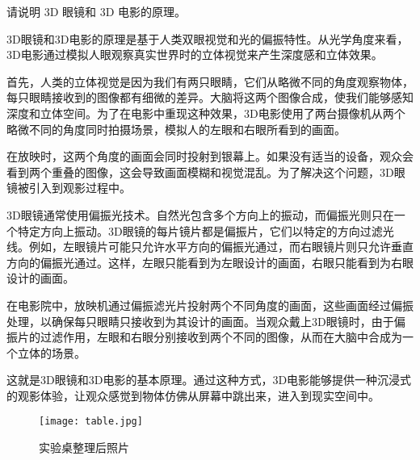 \documentclass[dvipsnames, svgnames,a4paper,11pt]{article}
\begin{document}
\begin{question}
	请说明 3D 眼镜和 3D 电影的原理。
\end{question}


3D眼镜和3D电影的原理是基于人类双眼视觉和光的偏振特性。从光学角度来看，3D电影通过模拟人眼观察真实世界时的立体视觉来产生深度感和立体效果。

首先，人类的立体视觉是因为我们有两只眼睛，它们从略微不同的角度观察物体，每只眼睛接收到的图像都有细微的差异。大脑将这两个图像合成，使我们能够感知深度和立体空间。为了在电影中重现这种效果，3D电影使用了两台摄像机从两个略微不同的角度同时拍摄场景，模拟人的左眼和右眼所看到的画面。

在放映时，这两个角度的画面会同时投射到银幕上。如果没有适当的设备，观众会看到两个重叠的图像，这会导致画面模糊和视觉混乱。为了解决这个问题，3D眼镜被引入到观影过程中。

3D眼镜通常使用偏振光技术。自然光包含多个方向上的振动，而偏振光则只在一个特定方向上振动。3D眼镜的每片镜片都是偏振片，它们以特定的方向过滤光线。例如，左眼镜片可能只允许水平方向的偏振光通过，而右眼镜片则只允许垂直方向的偏振光通过。这样，左眼只能看到为左眼设计的画面，右眼只能看到为右眼设计的画面。

在电影院中，放映机通过偏振滤光片投射两个不同角度的画面，这些画面经过偏振处理，以确保每只眼睛只接收到为其设计的画面。当观众戴上3D眼镜时，由于偏振片的过滤作用，左眼和右眼分别接收到两个不同的图像，从而在大脑中合成为一个立体的场景。

这就是3D眼镜和3D电影的基本原理。通过这种方式，3D电影能够提供一种沉浸式的观影体验，让观众感觉到物体仿佛从屏幕中跳出来，进入到现实空间中。



\begin{figure}[H]
	\centering
	\texttt{[image: table.jpg]}
	\caption{实验桌整理后照片}
\end{figure}
	
\end{document}
